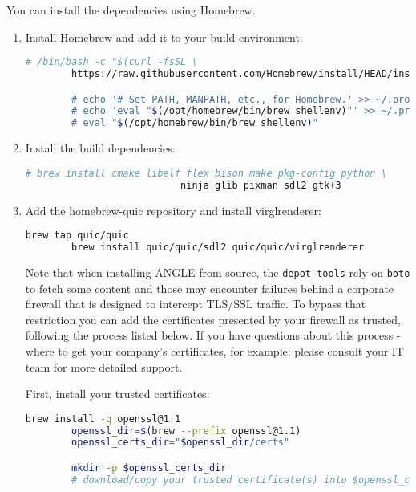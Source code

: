 You can install the dependencies using Homebrew.

\begin{enumerate}

\item Install Homebrew and add it to your build environment:
	\small
	\begin{lstlisting}[language=bash]
	    # /bin/bash -c "$(curl -fsSL \
	    https://raw.githubusercontent.com/Homebrew/install/HEAD/install.sh)"

	    # echo '# Set PATH, MANPATH, etc., for Homebrew.' >> ~/.profile
	    # echo 'eval "$(/opt/homebrew/bin/brew shellenv)"' >> ~/.profile
	    # eval "$(/opt/homebrew/bin/brew shellenv)"
	\end{lstlisting}
	\normalsize

\item Install the build dependencies:

	\small
	\begin{lstlisting}[language=bash]
	    # brew install cmake libelf flex bison make pkg-config python \
                           ninja glib pixman sdl2 gtk+3
	\end{lstlisting}
	\normalsize


\item Add the homebrew-quic repository and install virglrenderer:
	\small
	\begin{lstlisting}[language=bash]
		brew tap quic/quic
		brew install quic/quic/sdl2 quic/quic/virglrenderer
	\end{lstlisting}
	\normalsize

Note that when installing ANGLE from source, the {\lstinline!depot_tools!}
rely on {\lstinline!boto!} to fetch some content and those may encounter
failures behind a corporate firewall that is designed to intercept TLS/SSL
traffic.  To bypass that restriction you can add the certificates presented
by your firewall as trusted, following the process listed below.  If you
have questions about this process - where to get your company's certificates,
for example: please consult your IT team for more detailed support.

First, install your trusted certificates:

	\small
	\begin{lstlisting}[language=bash]
		brew install -q openssl@1.1
		openssl_dir=$(brew --prefix openssl@1.1)
		openssl_certs_dir="$openssl_dir/certs"

		mkdir -p $openssl_certs_dir
		# download/copy your trusted certificate(s) into $openssl_certs_dir/


\end{lstlisting}
\end{enumerate}

